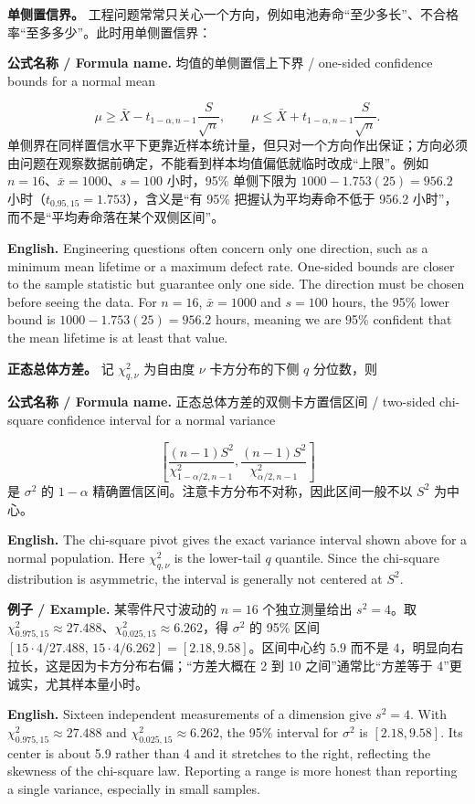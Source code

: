 \documentclass[UTF8,11pt,a4paper]{ctexart}
\newcommand{\EN}[1]{\par\noindent\textbf{English.} #1\par}
\newcommand{\FORMULA}[2]{\par\noindent\textbf{公式名称 / Formula name.} #1 / #2\par}
\newcommand{\EX}[2]{\par\noindent\textbf{例子 / Example.} #1\par\EN{#2}}
\begin{document}
\noindent\textbf{单侧置信界。} 工程问题常常只关心一个方向，例如电池寿命“至少多长”、不合格率“至多多少”。此时用单侧置信界：
\FORMULA{均值的单侧置信上下界}{one-sided confidence bounds for a normal mean}
\[
\mu\ge\bar X-t_{1-\alpha,n-1}\frac{S}{\sqrt n},
\qquad
\mu\le\bar X+t_{1-\alpha,n-1}\frac{S}{\sqrt n}.
\]
单侧界在同样置信水平下更靠近样本统计量，但只对一个方向作出保证；方向必须由问题在观察数据前确定，不能看到样本均值偏低就临时改成“上限”。例如 $n=16$、$\bar x=1000$、$s=100$ 小时，95\% 单侧下限为 $1000-1.753(25)=956.2$ 小时（$t_{0.95,15}=1.753$），含义是“有 95\% 把握认为平均寿命不低于 956.2 小时”，而不是“平均寿命落在某个双侧区间”。
\EN{Engineering questions often concern only one direction, such as a minimum mean lifetime or a maximum defect rate. One-sided bounds are closer to the sample statistic but guarantee only one side. The direction must be chosen before seeing the data. For $n=16$, $\bar x=1000$ and $s=100$ hours, the 95\% lower bound is $1000-1.753(25)=956.2$ hours, meaning we are 95\% confident that the mean lifetime is at least that value.}

\noindent\textbf{正态总体方差。} 记 $\chi^2_{q,\nu}$ 为自由度 $\nu$ 卡方分布的下侧 $q$ 分位数，则
\FORMULA{正态总体方差的双侧卡方置信区间}{two-sided chi-square confidence interval for a normal variance}
\[
\left[
\frac{(n-1)S^2}{\chi^2_{1-\alpha/2,n-1}},
\frac{(n-1)S^2}{\chi^2_{\alpha/2,n-1}}
\right]
\]
是 $\sigma^2$ 的 $1-\alpha$ 精确置信区间。注意卡方分布不对称，因此区间一般不以 $S^2$ 为中心。
\EN{The chi-square pivot gives the exact variance interval shown above for a normal population. Here $\chi^2_{q,\nu}$ is the lower-tail $q$ quantile. Since the chi-square distribution is asymmetric, the interval is generally not centered at $S^2$.}

\EX{某零件尺寸波动的 $n=16$ 个独立测量给出 $s^2=4$。取 $\chi^2_{0.975,15}\approx27.488$、$\chi^2_{0.025,15}\approx6.262$，得 $\sigma^2$ 的 95\% 区间 $[15\cdot4/27.488,\,15\cdot4/6.262]=[2.18,9.58]$。区间中心约 $5.9$ 而不是 $4$，明显向右拉长，这是因为卡方分布右偏；“方差大概在 2 到 10 之间”通常比“方差等于 4”更诚实，尤其样本量小时。}{Sixteen independent measurements of a dimension give $s^2=4$. With $\chi^2_{0.975,15}\approx27.488$ and $\chi^2_{0.025,15}\approx6.262$, the 95\% interval for $\sigma^2$ is $[2.18,9.58]$. Its center is about 5.9 rather than 4 and it stretches to the right, reflecting the skewness of the chi-square law. Reporting a range is more honest than reporting a single variance, especially in small samples.}
\end{document}
